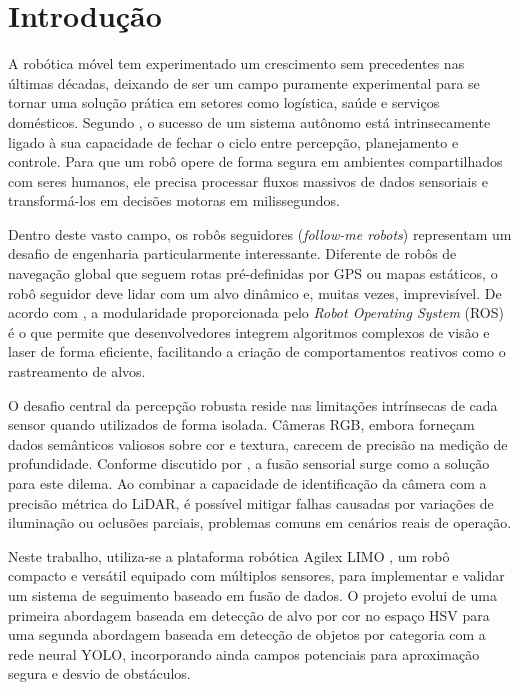 \section{Introdução}

A robótica móvel tem experimentado um crescimento sem precedentes nas últimas décadas, deixando de ser um campo puramente experimental para se tornar uma solução prática em setores como logística, saúde e serviços domésticos. Segundo \cite{pendleton2017}, o sucesso de um sistema autônomo está intrinsecamente ligado à sua capacidade de fechar o ciclo entre percepção, planejamento e controle. Para que um robô opere de forma segura em ambientes compartilhados com seres humanos, ele precisa processar fluxos massivos de dados sensoriais e transformá-los em decisões motoras em milissegundos.

Dentro deste vasto campo, os robôs seguidores (\textit{follow-me robots}) representam um desafio de engenharia particularmente interessante. Diferente de robôs de navegação global que seguem rotas pré-definidas por GPS ou mapas estáticos, o robô seguidor deve lidar com um alvo dinâmico e, muitas vezes, imprevisível. De acordo com \cite{quigley2015programming}, a modularidade proporcionada pelo \textit{Robot Operating System} (ROS) é o que permite que desenvolvedores integrem algoritmos complexos de visão e laser de forma eficiente, facilitando a criação de comportamentos reativos como o rastreamento de alvos.

O desafio central da percepção robusta reside nas limitações intrínsecas de cada sensor quando utilizados de forma isolada. Câmeras RGB, embora forneçam dados semânticos valiosos sobre cor e textura, carecem de precisão na medição de profundidade. Conforme discutido por \cite{zhang2019robust}, a fusão sensorial surge como a solução para este dilema. Ao combinar a capacidade de identificação da câmera com a precisão métrica do LiDAR, é possível mitigar falhas causadas por variações de iluminação ou oclusões parciais, problemas comuns em cenários reais de operação.

Neste trabalho, utiliza-se a plataforma robótica Agilex LIMO \cite{agilex2024limo}, um robô compacto e versátil equipado com múltiplos sensores, para implementar e validar um sistema de seguimento baseado em fusão de dados. O projeto evolui de uma primeira abordagem baseada em detecção de alvo por cor no espaço HSV para uma segunda abordagem baseada em detecção de objetos por categoria com a rede neural YOLO, incorporando ainda campos potenciais para aproximação segura e desvio de obstáculos.

